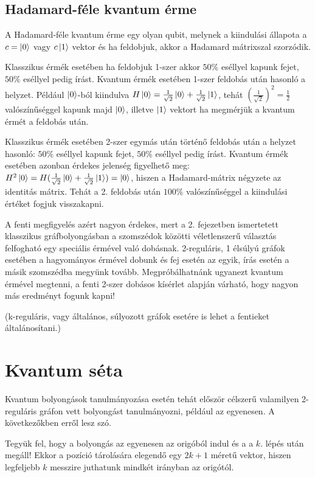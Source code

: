 \section{\textbf{Hadamard-féle kvantum érme}}

A Hadamard-féle kvantum érme egy olyan qubit, melynek a kiindulási állapota a
$c = \ket{0}$ vagy $c \ket{1}$ vektor és ha feldobjuk, akkor a Hadamard mátrixszal
szorzódik.

Klasszikus érmék esetében ha feldobjuk 1-szer akkor $50\%$ eséllyel kapunk fejet,
$50\%$ eséllyel pedig írást. Kvantum érmék esetében 1-szer feldobás után hasonló a helyzet.
Például $\ket{0}$-ból kiindulva $H\ket{0} = \frac{1}{\sqrt{2}}\ket{0} +
  \frac{1}{\sqrt{2}}\ket{1}$, tehát $(\frac{1}{\sqrt{2}})^2 = \frac{1}{2}$ valószínűséggel
kapunk majd $\ket{0}$, illetve $\ket{1}$ vektort ha megmérjük a kvantum érmét a feldobás után.

Klasszikus érmék esetében 2-szer egymás után történő feldobás után a helyzet
hasonló:  $50\%$ eséllyel kapunk fejet, $50\%$ eséllyel pedig írást. Kvantum érmék
esetében azonban érdekes jelenség figyelhető meg: $H^2\ket{0} = H(\frac{1}{\sqrt{2}}\ket{0} +
  \frac{1}{\sqrt{2}}\ket{1}) = \ket{0}$, hiszen a Hadamard-mátrix négyzete az
identitás mátrix. Tehát a 2. feldobás után $100\%$ valószínűséggel a kiindulási
értéket fogjuk visszakapni.

A fenti megfigyelés azért nagyon érdekes, mert a 2. fejezetben ismertetett
klasszikus gráfbolyongásban a szomszédok közötti véletlenszerű választás
felfogható egy speciális érmével való dobásnak. 2-reguláris, 1 élsúlyú gráfok
esetében a hagyományos érmével dobunk és fej esetén az egyik, írás esetén a másik
szomszédba megyünk tovább. Megpróbálhatnánk ugyanezt kvantum érmével megtenni,
a fenti 2-szer dobásos kísérlet alapján várható, hogy nagyon más eredményt fogunk
kapni!

(k-reguláris, vagy általános, súlyozott gráfok esetére is lehet a fentieket
általánosítani.)

\chapter{\textbf{Kvantum séta}}

Kvantum bolyongások tanulmányozása esetén tehát először célszerű valamilyen
2-reguláris gráfon vett bolyongást tanulmányozni, például az egyenesen. A következőkben
erről lesz szó.

Tegyük fel, hogy a bolyongás az egyenesen az origóból indul és a a $k.$ lépés
után megáll! Ekkor a pozíció tárolására elegendő egy $2k+1$ méretű vektor,
hiszen legfeljebb $k$ messzire juthatunk mindkét irányban az origótól.


